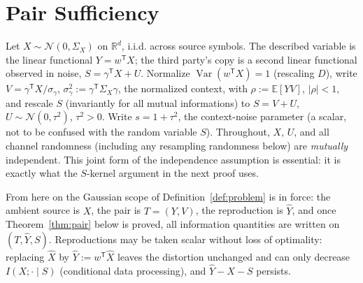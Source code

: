 ﻿\documentclass[11pt,onecolumn]{IEEEtran}
\newcommand{\E}{\mathbb{E}}
\newcommand{\R}{\mathbb{R}}
\newcommand{\hX}{\widehat{X}}
\newcommand{\hY}{\widehat{Y}}
\begin{document}
\section{Pair Sufficiency}
\label{sec:pair}

Let $X\sim\mathcal N(0,\Sigma_X)$ on $\R^d$, i.i.d. across source symbols.
The described variable is the linear functional $Y=w^{\mathsf T}X$; the third
party's copy is a second linear functional observed in noise,
$S=\gamma^{\mathsf T}X+U$. Normalize
$\operatorname{Var}(w^{\mathsf T}X)=1$ (rescaling $D$), write
$V=\gamma^{\mathsf T}X/\sigma_{\gamma}$, $\sigma_\gamma^2:=\gamma^{\mathsf T}\Sigma_X\gamma$,
the normalized context, with
$\rho:=\E[YV]$, $|\rho|<1$, and
rescale $S$ (invariantly for all mutual informations) to $S=V+U$,
$U\sim\mathcal N(0,\tau^2)$, $\tau^2>0$. Write $s=1+\tau^2$, the
context-noise parameter (a scalar, not to be confused with the random
variable $S$). Throughout,
$X$, $U$, and all channel randomness (including any resampling randomness
below) are \emph{mutually} independent. This joint form of the independence
assumption is essential: it is exactly what the $S$-kernel argument in
the next proof uses.

From here on the Gaussian scope of Definition~\ref{def:problem} is in
force: the ambient source is $X$, the pair is $T=(Y,V)$, the reproduction
is $\hY$, and once Theorem~\ref{thm:pair} below is proved, all
information quantities are written on $(T,\hY,S)$. Reproductions may be
taken scalar without loss of optimality: replacing
$\hX$ by $\hY:=w^{\mathsf T}\hX$ leaves the distortion unchanged and can
only decrease $I(X;\cdot\mid S)$ (conditional data processing), and
$\hY-X-S$ persists.
\end{document}

